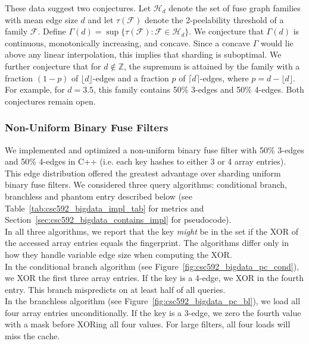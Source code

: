 \noindent
These data suggest two conjectures. Let $\mathcal{H}_d$ denote the set of fuse graph families with mean edge size $d$ and let $\tau(\mathcal{F})$ 
denote the 2-peelability threshold of a family $\mathcal{F}$. Define $\Gamma(d) = \sup \{ \tau(\mathcal{F}) : \mathcal{F} \in \mathcal{H}_d \}$. We conjecture 
that $\Gamma(d)$ is continuous, monotonically increasing, and concave. Since a concave $\Gamma$ would lie above any linear interpolation, this implies that 
sharding is suboptimal. We further conjecture that for $d \not \in \mathbb{Z}$, the supremum is attained by the family with a fraction $(1 - p)$ of 
$\lfloor d \rfloor$-edges and a fraction $p$ of $\lceil d \rceil$-edges, where $p = d - \lfloor d \rfloor$. For example, for $d = 3.5$, this family contains
50\% 3-edges and 50\% 4-edges. Both conjectures remain open.

\subsubsection{Non-Uniform Binary Fuse Filters}

\noindent
We implemented and optimized a non-uniform binary fuse filter with 50\% 3-edges and 50\% 4-edges in C++ (i.e. each key hashes to either 3 or 4 array entries). 
This edge distribution offered the greatest advantage over sharding uniform binary fuse filters. We considered three query algorithms: conditional branch, 
branchless and phantom entry described below (see Table~\ref{tab:csc592_bigdata_impl_tab} for metrics and Section~\ref{sec:csc592_bigdata_contains_impl} for 
pseudocode). \\



\noindent
In all three algorithms, we report that the key \emph{might} be in the set if the XOR of the accessed array entries equals the fingerprint. The algorithms 
differ only in how they handle variable edge size when computing the XOR. \\

\noindent
In the conditional branch algorithm (see Figure~\ref{fig:csc592_bigdata_pc_cond}), we XOR the first three array entries. If the key is a 4-edge, we XOR in the 
fourth entry. This branch mispredicts on at least half of all queries.  \\

\noindent
In the branchless algorithm (see Figure~\ref{fig:csc592_bigdata_pc_bl}), we load all four array entries unconditionally. If the key is a 3-edge, we zero the 
fourth value with a mask before XORing all four values. For large filters, all four loads will miss the cache. \\ 

